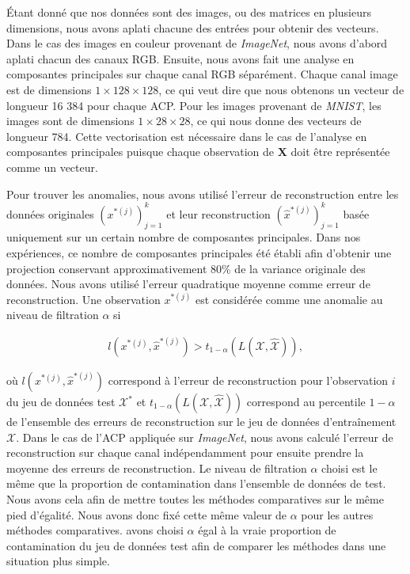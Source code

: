 \DIFdelend Étant donné que nos données sont des images, ou des matrices en plusieurs dimensions, nous avons aplati chacune des entrées pour obtenir des vecteurs. Dans le cas des images en couleur provenant de \textit{ImageNet}, nous avons d'abord aplati chacun des canaux RGB. Ensuite, nous avons fait une analyse en composantes principales sur chaque canal RGB séparément. Chaque canal image est de dimensions $1 \times 128 \times 128$, ce qui veut dire que nous obtenons un vecteur de longueur 16 384 pour chaque ACP. Pour les images provenant de \textit{MNIST}, les images sont de dimensions $1 \times 28 \times 28$, ce qui nous donne des vecteurs de longueur 784. Cette vectorisation est nécessaire dans le cas de l'analyse en composantes principales puisque chaque observation de $\mathbf{X}$ doit être représentée comme un vecteur.

Pour trouver les anomalies, nous avons utilisé l'erreur de reconstruction entre les données originales $(x^{*(j)})_{j=1}^k$ et
leur reconstruction $(\hat{x}^{*(j)})_{j=1}^k$ basée uniquement sur un certain nombre de composantes principales. Dans nos expériences, ce nombre de composantes principales \DIFdelbegin {}\DIFdelend \DIFaddbegin {}\DIFaddend été établi afin d'obtenir une projection conservant approximativement 80\% de la variance originale des données. Nous avons utilisé l'erreur quadratique moyenne comme erreur de reconstruction. Une observation $x^{*(j)}$ est considérée comme une anomalie au niveau de filtration $\alpha$ si

\begin{gather} \label{eq:anomalie_mse}
l(x^{*(j)}, \hat{x}^{*(j)}) > t_{1-\alpha}(L(\mathcal{X}, \hat{\mathcal{X}})),
\end{gather}

où $l(x^{*(j)}, \hat{x}^{*(j)})$ correspond à l'erreur de reconstruction pour l'observation $i$ du jeu de données test $\mathcal{X^*}$ et $t_{1-\alpha}(L(\mathcal{X}, \hat{\mathcal{X}}))$ correspond au percentile $1-\alpha$ de l'ensemble des erreurs de reconstruction sur le jeu de données d'entraînement $\mathcal{X}$. Dans le cas de l'ACP appliquée sur \textit{ImageNet}, nous avons calculé l'erreur de reconstruction sur chaque canal indépendamment pour ensuite prendre la moyenne des \DIFdelbegin {}\DIFdelend \DIFaddbegin {}\DIFaddend erreurs de reconstruction. Le niveau de filtration $\alpha$ choisi est le même que la proportion de contamination dans l'ensemble de données de test. Nous avons \DIFdelbegin {}\DIFdelend \DIFaddbegin {}\DIFaddend cela afin de mettre toutes les méthodes comparatives sur le même pied d'égalité. Nous avons donc fixé cette même valeur de $\alpha$ pour les \DIFdelbegin {}\DIFdelend \DIFaddbegin {}\DIFaddend autres méthodes comparatives. \DIFdelbegin {}\DIFdelend \DIFaddbegin {}\DIFaddend avons choisi $\alpha$ égal à la vraie proportion de contamination du jeu de données test afin de comparer les méthodes dans une situation plus simple.

